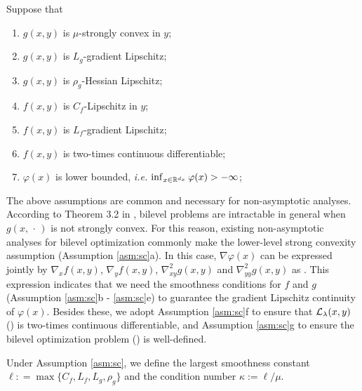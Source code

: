 \documentclass[twoside,11pt]{article}
\begin{document}
\begin{asm} \label{asm:sc}
Suppose that
\begin{enumerate}[label=\alph*.]
    \item $g(x,y)$ is $\mu$-strongly convex in $y$;
     \item $g(x,y)$ is $L_g$-gradient Lipschitz;
    \item $g(x,y)$ is $\rho_g$-Hessian Lipschitz;
     \item $f(x,y)$ is $C_f$-Lipschitz in $y$;
    \item $f(x,y)$ is $L_f$-gradient Lipschitz;
    \item $f(x,y)$ is two-times continuous differentiable;
    \item $\varphi(x)$ is lower bounded, \emph{i.e.} $\inf_{x \in {\mathbb{R}}^{d_x}} \varphi(x) > - \infty$;
\end{enumerate}
\end{asm}

The above assumptions are common and necessary for non-asymptotic analyses. {According to Theorem 3.2 in \citep{chen2024finding}, bilevel problems are intractable in general  when $g(x,\,\cdot\,)$ is not strongly convex. }
For this reason, existing non-asymptotic analyses for bilevel optimization commonly make the 
lower-level strong convexity assumption (Assumption \ref{asm:sc}a). In this case,  $\nabla \varphi(x)$ can be expressed jointly by $ \nabla_x f(x,y)$, $\nabla_y f(x,y)$, $\nabla_{xy}^2 g(x,y)$ and $ \nabla_{yy}^2 g(x,y)$ as .
This expression indicates that we need the smoothness conditions for $f$ and $g$ (Assumption \ref{asm:sc}b - \ref{asm:sc}e) to guarantee the gradient  Lipschitz continuity of $ \varphi(x)$. 
Besides these, 
we adopt Assumption \ref{asm:sc}f to ensure that $ {\mathcal{L}}_{\lambda}(x,y)$ () is two-times continuous differentiable, and
Assumption \ref{asm:sc}g to ensure the bilevel optimization problem () is well-defined. 

\begin{dfn}  \label{dfn:kappa-sc}
Under Assumption \ref{asm:sc}, we define the largest smoothness constant $\ell: =\max \{ C_f,L_f,L_g,\rho_g  \}$ and the condition number 
$\kappa:= \ell / \mu$. 
\end{dfn}
\end{document}
